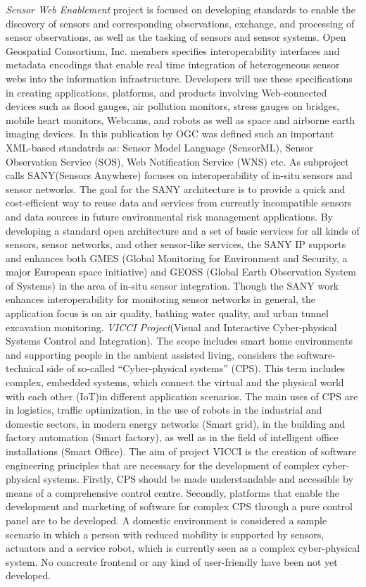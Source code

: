 \newline
	\emph{Sensor Web Enablement} project\cite{ogc} is focused on developing standards to enable the discovery of sensors and corresponding observations, exchange, and processing of sensor observations, as well as the tasking of sensors and sensor systems.
	 Open Geospatial Consortium, Inc. members specifies interoperability interfaces and metadata encodings that enable real time integration of heterogeneous sensor webs into the information infrastructure. Developers will use these specifications in creating applications, platforms, and products involving Web-connected devices such as flood gauges, air pollution monitors, stress gauges on bridges, mobile heart monitors, Webcams, and robots as well as space and airborne earth imaging devices. In this publication by OGC was defined such an important XML-based standatrds as: Sensor Model Language (SensorML), Sensor Observation Service (SOS), Web Notification Service (WNS) etc. As subproject calls SANY(Sensors Anywhere) focuses on interoperability of in-situ sensors and sensor networks. The goal for the SANY architecture is to provide a quick and cost-efficient way to reuse data and services from currently incompatible sensors and data sources in future environmental risk management applications. By developing a standard open architecture and a set of basic services for all kinds of sensors, sensor networks, and other sensor-like services, the SANY IP supports and enhances both GMES (Global Monitoring for Environment and Security, a major European space initiative) and GEOSS (Global Earth Observation System of Systems) in the area of in-situ sensor integration. Though the SANY work enhances interoperability for monitoring sensor networks in general, the application focus is on air quality, bathing water quality, and urban tunnel excavation monitoring.
\newline 
    \emph{VICCI Project}(Visual and Interactive Cyber-physical Systems Control and Integration)\cite{vicci}. The scope includes smart home environments and supporting people in the ambient assisted living, considers the software-technical side of so-called “Cyber-physical systems” (CPS). This term includes complex, embedded systems, which connect the virtual and the physical world with each other (IoT)in different application scenarios. The main uses of CPS are in logistics, traffic optimization, in the use of robots in the industrial and domestic sectors, in modern energy networks (Smart grid), in the building and factory automation (Smart factory), as well as in the field of intelligent office installations (Smart Office). The aim of project VICCI is the creation of software engineering principles that are necessary for the development of complex cyber-physical systems. Firstly, CPS should be made understandable and accessible by means of a comprehensive control centre. Secondly, platforms that enable the development and marketing of software for complex CPS through a pure control panel are to be developed. A domestic environment is considered a sample scenario in which a person with reduced mobility is supported by sensors, actuators and a service robot, which is currently seen as a complex cyber-physical system. No concreate frontend or any kind of user-friendly have been not yet developed. 
